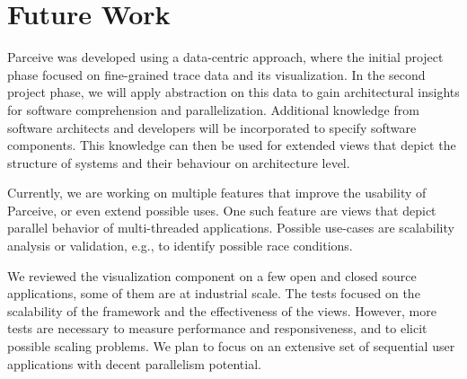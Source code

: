 \section{Future Work}
\label{sec:future_work}
Parceive was developed using a data-centric approach, where the initial project
phase focused on fine-grained trace data and its visualization. In the second
project phase, we will apply abstraction on this data to gain architectural
insights for software comprehension and parallelization. Additional knowledge
from software architects and developers will be incorporated to specify
software components. This knowledge can then be used for extended views that
depict the structure of systems and their behaviour on architecture level.

Currently, we are working on multiple features that improve the usability of
Parceive, or even extend possible uses. One such feature are views that depict
parallel behavior of multi-threaded applications. Possible use-cases are
scalability analysis or validation, e.g., to identify possible race conditions.

We reviewed the visualization component on a few open and closed source
applications, some of them are at industrial scale. The tests focused on the
scalability of the framework and the effectiveness of the views. However, more
tests are necessary to measure performance and responsiveness, and to elicit
possible scaling problems. We plan to focus on an extensive set of sequential
user applications with decent parallelism potential.